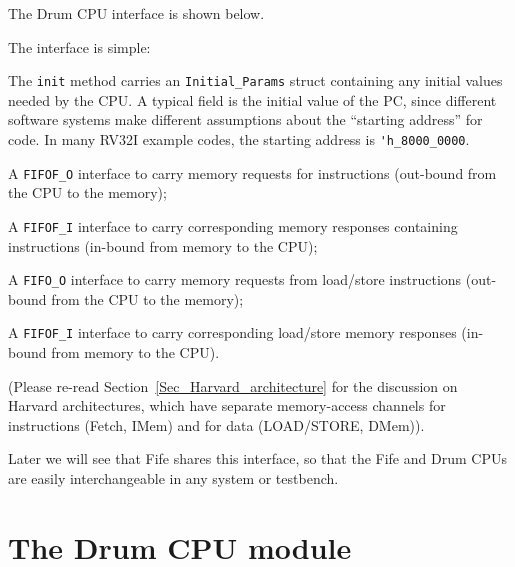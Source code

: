 \label{Sec_Drum_CPU_interface}


The Drum CPU interface is shown below.



The interface is simple:

\begin{tightlist}

  \item The \verb|init| method carries an \verb|Initial_Params| struct
    containing any initial values needed by the CPU.  A typical field
    is the initial value of the PC, since different software systems
    make different assumptions about the ``starting address'' for
    code.  In many RV32I example codes, the starting address is
    \verb|'h_8000_0000|.

  \item A \verb|FIFOF_O| interface to carry memory requests for
    instructions (out-bound from the CPU to the memory);

  \item A \verb|FIFOF_I| interface to carry corresponding memory
    responses containing instructions (in-bound from memory to the
    CPU);

  \item A \verb|FIFO_O| interface to carry memory requests from
    load/store instructions (out-bound from the CPU to the memory);

  \item A \verb|FIFOF_I| interface to carry corresponding load/store
    memory responses (in-bound from memory to the CPU).

\end{tightlist}

(Please re-read Section~\ref{Sec_Harvard_architecture} for the
discussion on Harvard architectures, which have separate memory-access
channels for instructions (Fetch, IMem) and for data (LOAD/STORE,
DMem)).

Later we will see that Fife shares this interface, so that the Fife
and Drum CPUs are easily interchangeable in any system or testbench.


\section{The Drum CPU module}

